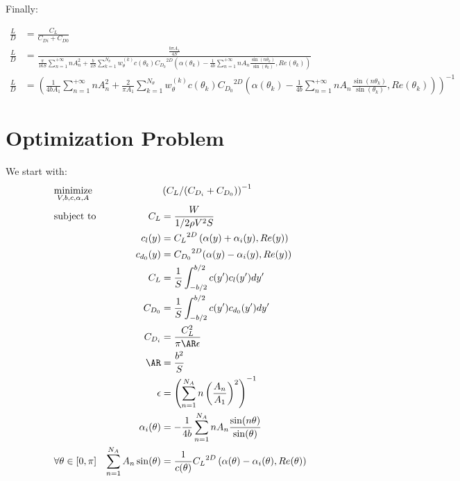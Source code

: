 \documentclass[letterpaper,12pt]{article}
\begin{document}
Finally:

\begin{align}
	\label{eq:ld}
	\frac L D &= \frac {C_L} 
	{C_{Di} + C_{D0}} \nonumber \\
	\frac L D &= \frac{\frac{b \pi A_1}{4S}}{
		\frac {\pi}{16S} \sum_{n=1}^{+\infty} n A_{n}^2 + 
		\frac b {2S} \sum_{k=1}^{N_{\theta}} w_{\theta}^{(k)} c(\theta_k) {C_{D_0}}^{2D}\left( \alpha(\theta_k) - \frac {1}{4b} \sum_{n=1}^{+\infty} n A_n \frac{ \sin(n\theta_k) }{\sin(\theta_k)} , Re(\theta_k)\right)
	} \nonumber \\
	\frac L D &= \left(	\frac {1}{4bA_1} \sum_{n=1}^{+\infty} n A_{n}^2 + 
		\frac {2} {\pi A_1} \sum_{k=1}^{N_{\theta}} w_{\theta}^{(k)} c(\theta_k) {C_{D_0}}^{2D}\left( \alpha(\theta_k) - \frac {1}{4b} \sum_{n=1}^{+\infty} n A_n \frac{ \sin(n\theta_k) }{\sin(\theta_k)} , Re(\theta_k)\right) 
	\right)^{-1} 
\end{align}


\section{Optimization Problem}

We start with:
\begin{align*}
	& \underset{V, b, c, \alpha, A}{\text{minimize}}
	& & \left( C_L / (C_{D_i} + C_{D_0})\right)^{-1} \nonumber \\
	& \text{subject to} 
	& C_L &= \frac{W}{1/2 \rho V^2 S} \\
	& & c_l(y) &= {C_L}^{2D} \left( \alpha(y) + \alpha_i(y), Re(y)\right) \\
	& & c_{d_0}(y) &= {C_{D_0}}^{2D}(\alpha(y) - \alpha_i(y), Re(y)) \\
	& & C_L &= \frac 1 S \int_{-b/2}^{b/2} c(y') c_l(y') dy'\\
	& & C_{D_0} &= \frac 1 S \int_{-b/2}^{b/2} c(y') c_{d_0}(y') dy'\\
	& & C_{D_i} & = \frac{C_L^2}{\pi \AR \epsilon} \\
	& & \AR &= \frac{b^2}{S} \\
	& & \epsilon &= \left(\sum_{n=1}^{N_A} n \left(\frac{A_n}{A_1}\right)^2 \right)^{-1} \\
	& & \alpha_i(\theta) &= -\frac 1 {4b} \sum_{n=1}^{N_A} n A_n\frac{\sin(n\theta)}{\sin(\theta)} \\
	& \forall \theta \in [0, \pi] & \sum_{n=1}^{N_A} A_n \sin(\theta) &= \frac{1}{c(\theta)} {C_L}^{2D} \left( \alpha(\theta) - \alpha_i(\theta), Re(\theta)\right) \\
\end{align*}
\end{document}
